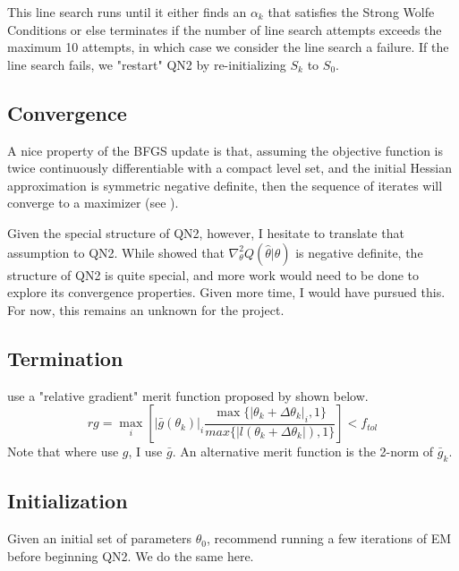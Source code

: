 \documentclass[letter,12pt]{article}
\begin{document}
This line search runs until it either finds an $\alpha_k$ that satisfies the Strong Wolfe Conditions or else terminates if the number of line search attempts exceeds the maximum 10 attempts, in which case we consider the line search a failure.  If the line search fails, we "restart" QN2 by re-initializing $S_k$ to $S_0$.

\subsection{Convergence} \label{section:qn2convergence}

A nice property of the BFGS update is that, assuming the objective function is twice continuously differentiable with a compact level set, and the initial Hessian approximation is symmetric negative definite, then the sequence of iterates will converge to a maximizer (see \cite{nocedalwright}).  

Given the special structure of QN2, however, I hesitate to translate that assumption to QN2.  While \cite{jamshidianj97} showed that $\nabla_\theta^2Q(\hat{\theta}|\hat{\theta})$ is negative definite, the structure of QN2 is quite special, and more work would need to be done to explore its convergence properties.  Given more time, I would have pursued this.  For now, this remains an unknown for the project.

\subsection{Termination}

\cite{jamshidianj97} use a "relative gradient" merit function proposed by \cite{khalfan93} shown below.
\begin{equation} \label{eq:rg}
rg = \max_i
\left[
|\bar{g}(\theta_k)|_i
\frac
{\max\{|\theta_k + \Delta \theta_k|_i,1\}}
{max\{|l(\theta_k + \Delta \theta_k|),1\}}
\right]
< f_{tol}
\end{equation}
Note that where \cite{jamshidianj97} use $g$, I use $\bar{g}$.  An alternative merit function is the 2-norm of $\bar{g}_k$.

\subsection{Initialization}

Given an initial set of parameters $\theta_0$, \cite{jamshidianj93} recommend running a few iterations of EM before beginning QN2.  We do the same here.
\end{document}
